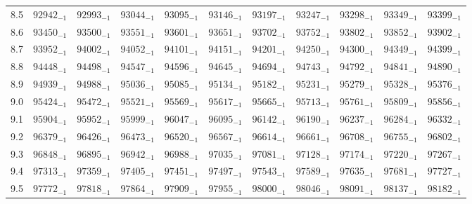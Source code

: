 \documentclass[10pt, a4paper]{article}
\begin{document}
\begin{center}
\begin{longtable}{c || c c c c c | c c c c c}
        8.5 & \({92942}_{-1}\) & \({92993}_{-1}\) & \({93044}_{-1}\) & \({93095}_{-1}\) & \({93146}_{-1}\) & \({93197}_{-1}\) & \({93247}_{-1}\) & \({93298}_{-1}\) & \({93349}_{-1}\) & \({93399}_{-1}\)\\
        8.6 & \({93450}_{-1}\) & \({93500}_{-1}\) & \({93551}_{-1}\) & \({93601}_{-1}\) & \({93651}_{-1}\) & \({93702}_{-1}\) & \({93752}_{-1}\) & \({93802}_{-1}\) & \({93852}_{-1}\) & \({93902}_{-1}\)\\
        8.7 & \({93952}_{-1}\) & \({94002}_{-1}\) & \({94052}_{-1}\) & \({94101}_{-1}\) & \({94151}_{-1}\) & \({94201}_{-1}\) & \({94250}_{-1}\) & \({94300}_{-1}\) & \({94349}_{-1}\) & \({94399}_{-1}\)\\
        8.8 & \({94448}_{-1}\) & \({94498}_{-1}\) & \({94547}_{-1}\) & \({94596}_{-1}\) & \({94645}_{-1}\) & \({94694}_{-1}\) & \({94743}_{-1}\) & \({94792}_{-1}\) & \({94841}_{-1}\) & \({94890}_{-1}\)\\
        8.9 & \({94939}_{-1}\) & \({94988}_{-1}\) & \({95036}_{-1}\) & \({95085}_{-1}\) & \({95134}_{-1}\) & \({95182}_{-1}\) & \({95231}_{-1}\) & \({95279}_{-1}\) & \({95328}_{-1}\) & \({95376}_{-1}\)\\
        9.0 & \({95424}_{-1}\) & \({95472}_{-1}\) & \({95521}_{-1}\) & \({95569}_{-1}\) & \({95617}_{-1}\) & \({95665}_{-1}\) & \({95713}_{-1}\) & \({95761}_{-1}\) & \({95809}_{-1}\) & \({95856}_{-1}\)\\
        9.1 & \({95904}_{-1}\) & \({95952}_{-1}\) & \({95999}_{-1}\) & \({96047}_{-1}\) & \({96095}_{-1}\) & \({96142}_{-1}\) & \({96190}_{-1}\) & \({96237}_{-1}\) & \({96284}_{-1}\) & \({96332}_{-1}\)\\
        9.2 & \({96379}_{-1}\) & \({96426}_{-1}\) & \({96473}_{-1}\) & \({96520}_{-1}\) & \({96567}_{-1}\) & \({96614}_{-1}\) & \({96661}_{-1}\) & \({96708}_{-1}\) & \({96755}_{-1}\) & \({96802}_{-1}\)\\
        9.3 & \({96848}_{-1}\) & \({96895}_{-1}\) & \({96942}_{-1}\) & \({96988}_{-1}\) & \({97035}_{-1}\) & \({97081}_{-1}\) & \({97128}_{-1}\) & \({97174}_{-1}\) & \({97220}_{-1}\) & \({97267}_{-1}\)\\
        9.4 & \({97313}_{-1}\) & \({97359}_{-1}\) & \({97405}_{-1}\) & \({97451}_{-1}\) & \({97497}_{-1}\) & \({97543}_{-1}\) & \({97589}_{-1}\) & \({97635}_{-1}\) & \({97681}_{-1}\) & \({97727}_{-1}\)\\
        9.5 & \({97772}_{-1}\) & \({97818}_{-1}\) & \({97864}_{-1}\) & \({97909}_{-1}\) & \({97955}_{-1}\) & \({98000}_{-1}\) & \({98046}_{-1}\) & \({98091}_{-1}\) & \({98137}_{-1}\) & \({98182}_{-1}\)\\

\end{longtable}
\end{center}
\end{document}
